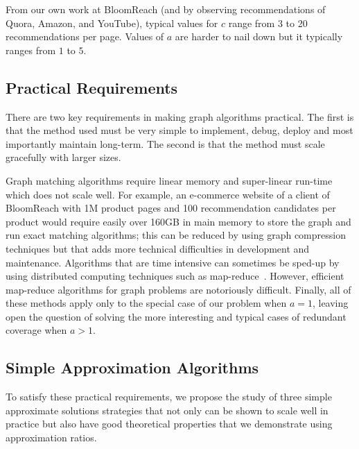 From our own work at BloomReach (and by observing recommendations of Quora, Amazon, and YouTube), typical values for $c$ range from 3 to 20
recommendations per page. Values of $a$ are harder to nail down but it
typically ranges from $1$ to $5$.\vs


\subsection{Practical Requirements}

There are two key requirements in making graph algorithms
practical. The first is that the method used must be very simple to
implement, debug, deploy and most importantly maintain long-term. The second is that the method must scale
gracefully with larger sizes. \vs

Graph matching algorithms require linear memory and super-linear run-time
which does not scale well. For example, an e-commerce website of a
client of BloomReach with 1M product pages and 100 recommendation
candidates per product would require easily over 160GB in main memory to store the graph
and run exact matching algorithms; this can be reduced by using graph
compression techniques but that adds more technical difficulties in
development and maintenance. Algorithms that are time intensive
can sometimes be sped-up by using distributed computing techniques such as
map-reduce~\cite{DeanGhemawat2004}. However, efficient map-reduce
algorithms for graph problems are notoriously difficult. Finally, all of these methods apply only to the special case of our problem when $a=1$, leaving open the question of solving the more interesting and typical cases of redundant coverage when $a > 1$.\vs

\subsection{Simple Approximation Algorithms}

To satisfy these practical requirements,
we propose
the study of three simple approximate solutions strategies that not only can be shown to scale well in practice but also have good theoretical
properties that we demonstrate using approximation ratios.

